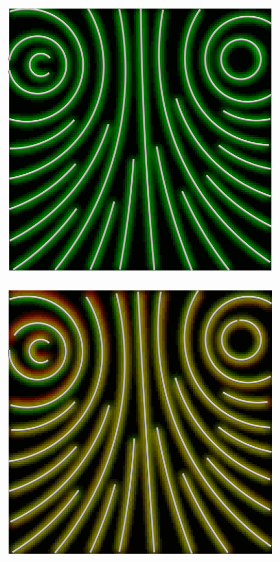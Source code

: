 \begin{figure}[ht]
\begin{subfigure}{\textwidth}
\begin{subfigure}{.19\textwidth}
        \end{subfigure}
        \begin{subfigure}{.19\textwidth}
            \centering
            \includegraphics[scale=.055]{figures/AlphaStudy/Gyro33C.0001.png}
        \end{subfigure}
        \begin{subfigure}{.19\textwidth}
            \centering
            \includegraphics[scale=.055]{figures/AlphaStudy/Gyro33C.0002.png}

\end{subfigure}
\end{subfigure}
\end{figure}
